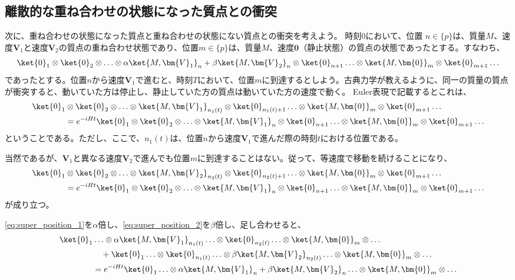 \subsection{離散的な重ね合わせの状態になった質点との衝突}
次に、重ね合わせの状態になった質点と重ね合わせの状態にない質点との衝突を考えよう。
時刻$0$において、位置 $n \in \{p\}$は、質量$M$、速度$\bm{V}_1$と速度$\bm{V}_2$の質点の重ね合わせ状態であり、位置$m \in \{p\}$は、質量$M$、速度$\bm{0}$（静止状態）の質点の状態であったとする。すなわち、
\begin{equation}
    \ket{0}_1 \otimes \ket{0}_2 \otimes \ldots \otimes \alpha \ket{M,\bm{V}_1}_n + \beta \ket{M,\bm{V}_2}_n \otimes \ket{0}_{n+1} \ldots \otimes \ket{M,\bm{0}}_m \otimes \ket{0}_{m+1} \ldots
\end{equation}
であったとする。位置$n$から速度$\bm{V}_1$で進むと、時刻$T$において、位置$m$に到達するとしよう。古典力学が教えるように、同一の質量の質点が衝突すると、動いていた方は停止し、静止していた方の質点は動いていた方の速度で動く。
Euler表現で記載するとこれは、
\begin{align}
    \label{eq:super_position_1}
    \ket{0}_1 & \otimes \ket{0}_2 \otimes \ldots \otimes \ket{M,\bm{V}_1}_{n_1(t)} \otimes \ket{0}_{n_1(t)+1} \ldots \otimes \ket{M,\bm{0}}_m \otimes \ket{0}_{m+1} \ldots \\
    &=e^{-iHt}\ket{0}_1 \otimes \ket{0}_2 \otimes \ldots \otimes \ket{M,\bm{V}_1}_n \otimes \ket{0}_{n+1} \ldots \otimes \ket{M,\bm{0}}_m \otimes \ket{0}_{m+1} \ldots \nonumber
\end{align}
ということである。ただし、ここで、$n_1(t)$は、位置$n$から速度$\bm{V}_1$で進んだ際の時刻$t$における位置である。\par
当然であるが、$\bm{V}_1$と異なる速度$\bm{V}_2$で進んでも位置$m$に到達することはない。従って、等速度で移動を続けることになり、
\begin{align}
    \label{eq:super_position_2}
    \ket{0}_1 & \otimes \ket{0}_2 \otimes \ldots \otimes \ket{M,\bm{V}_2}_{n_2(t)} \otimes \ket{0}_{n_2(t)+1} \ldots \otimes \ket{M,\bm{0}}_m \otimes \ket{0}_{m+1} \ldots \\
    &=e^{-iHt}\ket{0}_1 \otimes \ket{0}_2 \otimes \ldots \otimes \ket{M,\bm{V}_1}_n \otimes \ket{0}_{n+1} \ldots \otimes \ket{M,\bm{0}}_m \otimes \ket{0}_{m+1} \ldots \nonumber
\end{align}
が成り立つ。\par
\eqref{eq:super_position_1}を$\alpha$倍し、\eqref{eq:super_position_2}を$\beta$倍し、足し合わせると、
\begin{align}
    \label{eq:super_position_12}
    \ket{0}_1 & \ldots \otimes \alpha \ket{M,\bm{V}_1}_{n_1(t)} \ldots \otimes \ket{0}_{n_2(t)}  \ldots \otimes \ket{M,\bm{0}}_m \otimes\ldots \\
    & \quad + \ket{0}_1 \ldots \otimes \ket{0}_{n_1(t)} \ldots \otimes \beta \ket{M,\bm{V}_2}_{n_2(t)}  \ldots \otimes \ket{M,\bm{0}}_m \otimes \ldots \nonumber \\
    &=e^{-iHt}\ket{0}_1 \ldots \otimes \alpha \ket{M,\bm{V}_1}_n + \beta \ket{M,\bm{V}_2}_n \ldots \otimes \ket{M,\bm{0}}_m \otimes \ldots \nonumber
\end{align}
